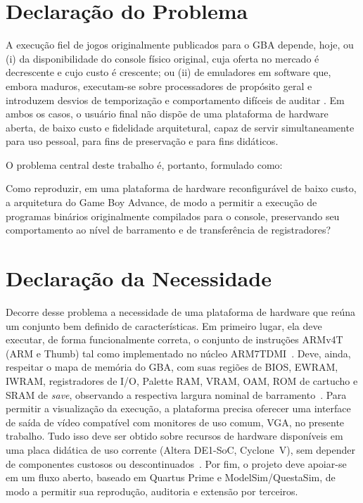 \documentclass[pnumromarab,times]{politex}
\begin{document}
\section{Declaração do Problema}
\label{sec:problema}

A execução fiel de jogos originalmente publicados para o GBA
depende, hoje, ou (i) da disponibilidade do console físico original,
cuja oferta no mercado é decrescente e cujo custo é crescente; ou
(ii) de emuladores em software que, embora maduros, executam-se
sobre processadores de propósito geral e introduzem desvios de
temporização e comportamento difíceis de auditar
\cite{Copetti2019,NanoBoyAdvance}. Em ambos os casos, o usuário
final não dispõe de uma plataforma de hardware aberta, de baixo
custo e fidelidade arquitetural, capaz de servir simultaneamente
para uso pessoal, para fins de preservação e para fins didáticos.

O problema central deste trabalho é, portanto, formulado como:

\begin{citacaoLonga}
    Como reproduzir, em uma plataforma de hardware reconfigurável
    de baixo custo, a arquitetura do Game Boy Advance, de modo a
    permitir a execução de programas binários originalmente compilados
    para o console, preservando seu comportamento ao nível de
    barramento e de transferência de registradores?
\end{citacaoLonga}


\section{Declaração da Necessidade}
\label{sec:necessidade}

Decorre desse problema a necessidade de uma plataforma de hardware
que reúna um conjunto bem definido de características. Em primeiro
lugar, ela deve executar, de forma funcionalmente correta, o conjunto
de instruções ARMv4T (ARM e Thumb) tal como implementado no núcleo
ARM7TDMI~\cite{ARM_DDI0210B}. Deve, ainda, respeitar o mapa de
memória do GBA, com suas regiões de BIOS, EWRAM, IWRAM, registradores
de I/O, Palette RAM, VRAM, OAM, ROM de cartucho e SRAM de \textit{save},
observando a respectiva largura nominal de barramento~\cite{Copetti2019,
Vijn_Tonc}. Para permitir a visualização da execução, a plataforma
precisa oferecer uma interface de saída de vídeo compatível com
monitores de uso comum, VGA, no presente trabalho. Tudo isso deve
ser obtido sobre recursos de hardware disponíveis em uma placa
didática de uso corrente (Altera DE1-SoC, Cyclone~V), sem depender de
componentes custosos ou descontinuados~\cite{TerasicDE1SoC,CycloneV}.
Por fim, o projeto deve apoiar-se em um fluxo aberto, baseado em
Quartus Prime e ModelSim/QuestaSim, de modo a permitir sua reprodução,
auditoria e extensão por terceiros.
\end{document}
